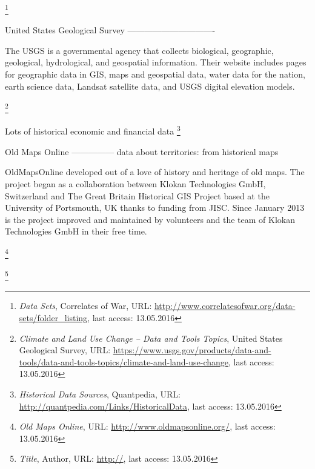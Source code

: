 \footnote{
  \textit{Data Sets},
  Correlates of War,
  URL: \url{http://www.correlatesofwar.org/data-sets/folder_listing},
  last access: 13.05.2016
}


United States Geological Survey
-------------------------------

The USGS is a governmental agency that collects biological, geographic, geological, hydrological, and geospatial information. Their website includes pages for geographic data in GIS, maps and geospatial data, water data for the nation, earth science data, Landsat satellite data, and USGS digital elevation models.

\footnote{
  \textit{Climate and Land Use Change -- Data and Tools Topics},
  United States Geological Survey,
  URL: \url{https://www.usgs.gov/products/data-and-tools/data-and-tools-topics/climate-and-land-use-change},
  last access: 13.05.2016
}

Lots of historical economic and financial data
\footnote{
  \textit{Historical Data Sources},
  Quantpedia,
  URL: \url{http://quantpedia.com/Links/HistoricalData},
  last access: 13.05.2016
}


Old Maps Online
---------------
data about territories: from historical maps

OldMapsOnline developed out of a love of history and heritage of old maps. The project began as a collaboration between Klokan Technologies GmbH, Switzerland and The Great Britain Historical GIS Project based at the University of Portsmouth, UK thanks to funding from JISC. Since January 2013 is the project improved and maintained by volunteers and the team of Klokan Technologies GmbH in their free time.



\footnote{
  \textit{Old Maps Online},
  URL: \url{http://www.oldmapsonline.org/},
  last access: 13.05.2016
}

\footnote{
  \textit{Title},
  Author,
  URL: \url{http://},
  last access: 13.05.2016
}


